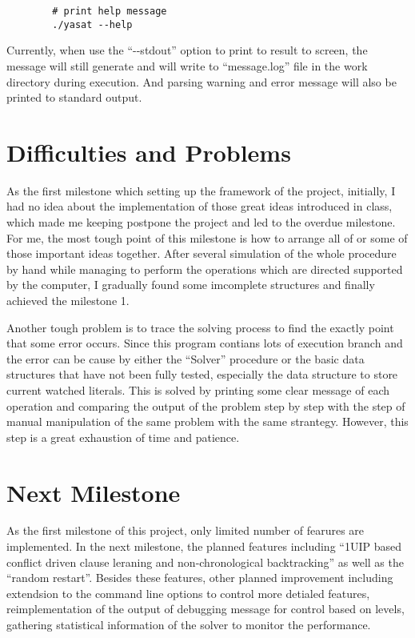 \documentclass[a4paper, 11.5pt]{article}
\begin{document}
\begin{multicols}{2}
\begin{tcolorbox}[breakable, blanker, width=\linewidth]
\begin{verbatim}
        # print help message
        ./yasat --help
      \end{verbatim}
    \end{tcolorbox}

    Currently, when use the ``-\--stdout'' option to print to result to screen, the message will still generate and will write to ``message.log'' file in the work directory during execution. 
    And parsing warning and error message will also be printed to standard output.

  \section{Difficulties and Problems}

  As the first milestone which setting up the framework of the project, initially, I had no idea
  about the implementation of those great ideas introduced in class, which made me keeping 
  postpone the project and led to the overdue milestone. For me, the most tough point of this 
  milestone is how to arrange all of or some of those important ideas together. After several 
  simulation of the whole procedure by hand while managing to perform the operations which are 
  directed supported by the computer, I gradually found some imcomplete structures and finally 
  achieved the milestone 1.

  Another tough problem is to trace the solving process to find the exactly point that some error occurs. Since this program contians lots of execution branch and the error can be cause by either the ``Solver'' procedure or the basic data structures that have not been fully tested, especially the data structure to store current watched literals. This is solved by printing some clear message of each operation and comparing the output of the problem step by step with 
  the step of manual manipulation of the same problem with the same strantegy. However, this step is a great exhaustion of time and patience. 

  \section{Next Milestone}

  As the first milestone of this project, only limited number of fearures are implemented.
  In the next milestone, the planned features including ``1UIP based conflict driven clause leraning and non-chronological backtracking'' as well as the ``random restart''. Besides these 
  features, other planned improvement including extendsion to the command line options to 
  control more detialed features, reimplementation of the output of debugging message for
  control based on levels, gathering statistical information of the solver to monitor the 
  performance.

  \end{multicols}
\end{document}
